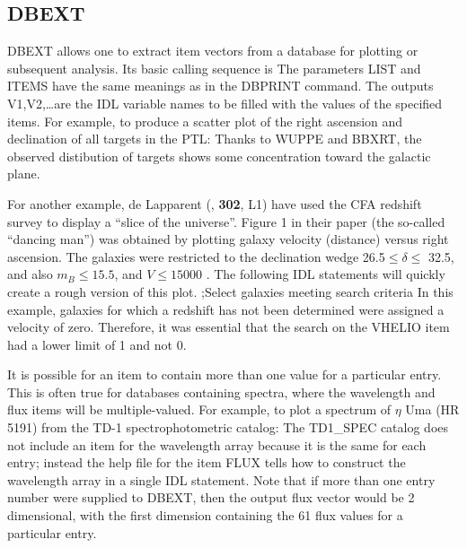 \subsection{DBEXT}
DBEXT allows one to extract item vectors from a database for plotting
or subsequent analysis.  Its basic calling sequence is 
The parameters LIST and ITEMS have the same meanings as in the DBPRINT
command.  The outputs V1,V2,\ldots are the IDL variable names to be
filled with the values of the specified items.  For example, to produce
a scatter plot of the right ascension and declination of all targets
in the PTL:
\exbegin
{}
\exend 
Thanks to WUPPE and BBXRT, the observed distibution of targets shows some
concentration toward the galactic plane.

For another example, de Lapparent \ea (\apjl, {\bf 302}, L1) have used the
CFA redshift survey to display a ``slice of the universe''.  Figure 1
in their paper (the so-called ``dancing man'') was obtained by plotting
galaxy velocity (distance) versus right ascension.  The galaxies were
restricted to the declination wedge 26.5\de $\leq \delta \leq$ 32.5\de,
and also $m_{B} \leq 15.5$, and $V \leq 15000$ \kms.   The following
IDL statements will quickly create a rough version of this plot.
\exbegin
{}
{;Select galaxies meeting search criteria}
\exend
In this example, galaxies for which a redshift has not been determined
were assigned a velocity of zero.  Therefore, it was essential that the search
on the VHELIO item had a lower limit of 1 and not 0.

It is possible for an item to contain more than one value for a particular
entry.  This is often true for databases containing spectra,   
where the wavelength and flux items will be multiple-valued.
For example, to plot a spectrum of $\eta$ Uma (HR 5191) from the 
TD-1 spectrophotometric catalog:
\exbegin
{}
\exend
The TD1\_SPEC catalog does not include an item for the wavelength array
because it is the same for each entry; instead the help file for the
item FLUX tells how to construct the wavelength array in a single IDL
statement.  Note that if more than one entry number were supplied to DBEXT,
then the output flux vector would be 2 dimensional, with the first dimension
containing the 61 flux values for a particular entry. 

